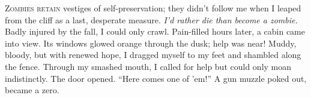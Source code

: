 
\lettrine{Z}{ombies retain} vestiges of self-preservation; they didn't follow me when
I leaped from the cliff as a last, desperate measure. \emph{I'd rather
die than become a zombie.} Badly injured by the fall, I could only
crawl. Pain-filled hours later, a cabin came into view. Its windows
glowed orange through the dusk; help was near! Muddy, bloody, but with
renewed hope, I dragged myself to my feet and shambled along the fence.
Through my smashed mouth, I called for help but could only moan
indistinctly. The door opened. ``Here comes one of 'em!'' A gun muzzle
poked out, became a zero.

